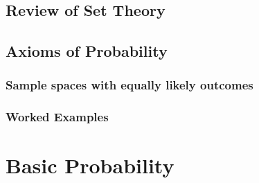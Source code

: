 \documentclass[
  12pt,
]{krantzNoCorner}
\begin{document}
\hypertarget{review-of-set-theory}{%
\section{Review of Set Theory}\label{review-of-set-theory}}

\hypertarget{axioms-of-probability}{%
\section{Axioms of Probability}\label{axioms-of-probability}}

\hypertarget{sample-spaces-with-equally-likely-outcomes}{%
\subsection{Sample spaces with equally likely outcomes}\label{sample-spaces-with-equally-likely-outcomes}}

\hypertarget{worked-examples-1}{%
\subsection{Worked Examples}\label{worked-examples-1}}

\hypertarget{basic-probability}{%
\chapter{Basic Probability}\label{basic-probability}}
\end{document}
